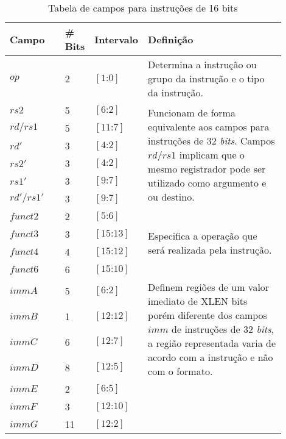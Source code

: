  \begin{table}
    \begin{tabular}{ |p{0.2\linewidth}|p{0.08\linewidth}|p{0.12\linewidth}|p{0.5\linewidth}| } 
      \hline
      Campo & {\#} Bits & Intervalo & Definição \\ \hline \hline
      $op$ & 2 & $[1\text{:}0]$ & Determina a instrução ou grupo da instrução e o tipo da instrução. \\ \hline
      $rs2$ & 5 & $[6\text{:}2]$ & 
      \multirow{6}{1.0\linewidth}{Funcionam de forma equivalente aos campos para instruções de 32 \emph{bits}. 
      Campos $rd$/$rs1$ implicam que o mesmo registrador pode ser utilizado como argumento e ou destino.}  \\
      $rd\text{/}rs1$ & 5 & $[11\text{:}7]$ & \\
      $rd'$ & 3 & $[4\text{:}2]$ & \\
      $rs2'$ & 3 & $[4\text{:}2]$ & \\
      $rs1'$ & 3 & $[9\text{:}7]$ & \\
      $rd'\text{/}rs1'$ & 3 & $[9\text{:}7]$ & \\ \hline
      $funct2$ & 2 & $[5\text{:}6]$ &  
      \multirow{4}{1.0\linewidth}{Especifica a operação que será realizada pela instrução.}\\
      $funct3$ & 3 & $[15\text{:}13]$ & \\
      $funct4$ & 4 & $[15\text{:}12]$ & \\
      $funct6$ & 6 & $[15\text{:}10]$ & \\ \hline
      $immA$ & 5 & $[6\text{:}2]$ & 
      \multirow{4}{1.0\linewidth}{Definem regiões de um valor imediato de XLEN bits porém diferente dos campos $imm$ de
        instruções de 32 \emph{bits}, a região representada varia de acordo com a instrução
         e não com o formato.} \\ 
      $immB$ & 1 & $[12\text{:}12]$ & \\
      $immC$ & 6 & $[12\text{:}7]$ & \\
      $immD$ & 8 & $[12\text{:}5]$ & \\
      $immE$ & 2 & $[6\text{:}5]$ & \\
      $immF$ & 3 & $[12\text{:}10]$ & \\
      $immG$ & 11 & $[12\text{:}2]$ & \\ \hline
    \end{tabular}
  
    \caption{Tabela de campos para instruções de 16 bits \label{tab:if16}}
    \end{table}
  
